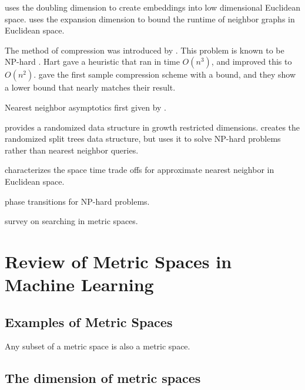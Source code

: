 \documentclass[../main.tex]{subfiles}
\begin{document}
\cite{indyk2007nearest} uses the doubling dimension to create embeddings into low dimensional Euclidean space.
\cite{connor2010fast} uses the expansion dimension to bound the runtime of neighbor graphs in Euclidean space.

The method of compression was introduced by \citet{hart1968condensed}.
This problem is known to be NP-hard \citep{zukhba2010np}.
Hart gave a heuristic that ran in time $O(n^3)$,
and\cite{angiulli2005fast} improved this to $O(n^2)$.
\cite{gottlieb2014near} gave the first sample compression scheme with a bound,
and they show a lower bound that nearly matches their result.

Nearest neighbor asymptotics first given by \citet{cover1967nearest}.

\cite{hildrum2004note} provides a randomized data structure in growth restricted dimensions.
\cite{talwar2004bypassing} creates the randomized split trees data structure,
but uses it to solve NP-hard problems rather than nearest neighbor queries.

\cite{arya2009space} characterizes the space time trade offs for approximate nearest neighbor in Euclidean space.

\cite{cheeseman1991really} phase transitions for NP-hard problems.

\cite{chavez2001searching} survey on searching in metric spaces.


\section{Review of Metric Spaces in Machine Learning}


\subsection{Examples of Metric Spaces}

\begin{example}
    Any subset of a metric space is also a metric space.
\end{example}


\subsection{The dimension of metric spaces}
\end{document}
